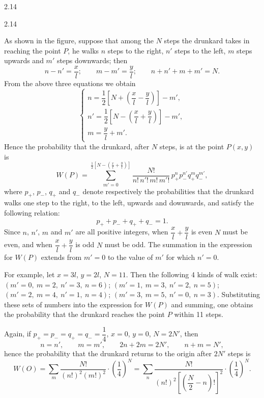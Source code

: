 \begin{solution}{2.14}
\begin{figbox}{2.14}
\end{figbox}

As shown in the figure, suppose that among the $N$ steps the drunkard takes in reaching the point $P$, he walks $n$ steps to the right, $n'$ steps to the left, $m$ steps upwards and $m'$ steps downwards; then
\[
n-n'=\frac{x}{l};\qquad m-m'=\frac{y}{l};\qquad n+n'+m+m'=N.
\]
From the above three equations we obtain
\[
\begin{cases}
n=\dfrac{1}{2}\left[N+\left(\dfrac{x}{l}-\dfrac{y}{l}\right)\right]-m',\\[10pt]
n'=\dfrac{1}{2}\left[N-\left(\dfrac{x}{l}+\dfrac{y}{l}\right)\right]-m',\\[10pt]
m=\dfrac{y}{l}+m'.
\end{cases}
\]
Hence the probability that the drunkard, after $N$ steps, is at the point $P(x,y)$ is
\[
W(P)=\sum_{m'=0}^{\frac{1}{2}\left[N-\left(\frac{x}{l}+\frac{y}{l}\right)\right]}
\frac{N!}{n!\,n'!\,m!\,m'!}\,p_+^{n}p_-^{n'}q_+^{m}q_-^{m'},
\]
where $p_+$, $p_-$, $q_+$ and $q_-$ denote respectively the probabilities that the drunkard walks one step to the right, to the left, upwards and downwards, and satisfy the following relation:
\[
p_++p_-+q_++q_-=1.
\]
Since $n$, $n'$, $m$ and $m'$ are all positive integers, when $\dfrac{x}{l}+\dfrac{y}{l}$ is even $N$ must be even, and when $\dfrac{x}{l}+\dfrac{y}{l}$ is odd $N$ must be odd. The summation in the expression for $W(P)$ extends from $m'=0$ to the value of $m'$ for which $n'=0$.

For example, let $x=3l$, $y=2l$, $N=11$. Then the following 4 kinds of walk exist: $(m'=0,\ m=2,\ n'=3,\ n=6)$; $(m'=1,\ m=3,\ n'=2,\ n=5)$; $(m'=2,\ m=4,\ n'=1,\ n=4)$; $(m'=3,\ m=5,\ n'=0,\ n=3)$. Substituting these sets of numbers into the expression for $W(P)$ and summing, one obtains the probability that the drunkard reaches the point $P$ within 11 steps.

Again, if $p_+=p_-=q_+=q_-=\dfrac{1}{4}$, $x=0$, $y=0$, $N=2N'$, then
\[
n=n',\qquad m=m',\qquad 2n+2m=2N',\qquad n+m=N',
\]
hence the probability that the drunkard returns to the origin after $2N'$ steps is
\[
W(O)=\sum_{m}\frac{N!}{(n!)^2(m!)^2}\cdot\left(\frac{1}{4}\right)^{N}
=\sum_{n}\frac{N!}{(n!)^2\left[\left(\dfrac{N}{2}-n\right)!\right]^2}\cdot\left(\frac{1}{4}\right)^{N}.
\]
\end{solution}

